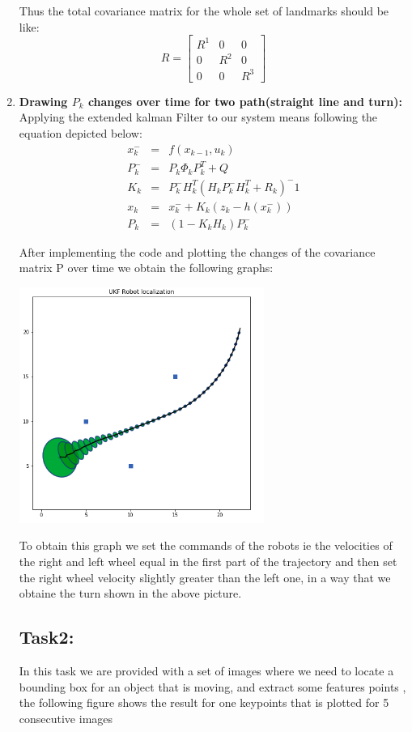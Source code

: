 \documentclass[11pt,a4paper]{report}
\begin{document}
\begin{enumerate}
Thus the total covariance matrix for the whole set of landmarks should be like:
$$ R = \left [ \begin{array}{ccc} R^1 & 0 & 0 \\ 0 & R^2 & 0\\	
0 & 0 & R^3    \end{array} \right ] $$
 
\item \textbf{Drawing $P_{k}$ changes over time for two path(straight line and turn):} 
Applying the extended kalman Filter to our system means following the equation depicted below:
\begin{eqnarray}
x_{k}^- &=& f(x_{k-1}, u_{k}) \label{eq3}\\
P_{k}^- &=& P_{k} \Phi_{k} P_{k}^T  + Q \label{eq4}\\
K_{k} &=& P_{k}^- H_{k}^T (H_{k} P_{k}^-H_{k}^T  + R_{k})^-1 \label{eq5}\\
x_{k} &=& x_{k}^- +K_{k}(z_{k} - h(x_{k}^-)) \label{eq6}\\
P_{k} &=& (1 - K_{k}H_{k} ) P_{k}^-  \label{eq7} 
\end{eqnarray} 
 
After implementing the code and plotting the changes of the covariance matrix P over time we obtain the following graphs:
 
\begin{center}\label{fig2}
	\includegraphics[width=8cm]{Capture2.png}
\end{center}
 
To obtain this graph we set the commands of the robots ie the velocities of the right and left wheel equal in the first part of the trajectory and then set the right wheel velocity slightly greater than the left one, in a way that we obtaine the turn shown in the above picture. 
 
\subsection{\textbf{Task2:}}
In this task we are provided with a set of images where we need to locate a bounding box for an object that is moving, and extract some features points , the following figure shows the result for one keypoints that is plotted for 5 consecutive images     
\end{enumerate}
\end{document}
